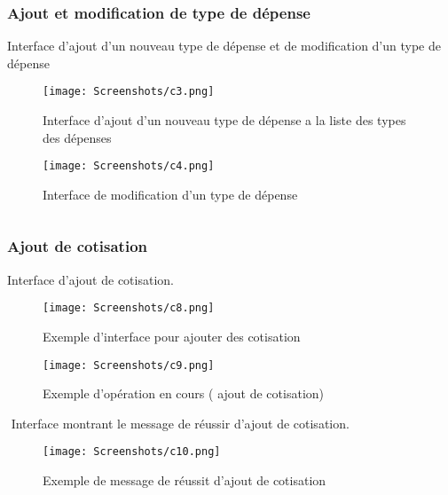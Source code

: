       \subsubsection{Ajout et modification de type de dépense}
      Interface d'ajout d'un nouveau type de dépense et de modification d'un type de dépense
      \begin{figure}[!htbp]
        \begin{minipage}[t]{0.4\textwidth}    %
                \texttt{[image: Screenshots/c3.png]}
                \caption{ Interface d'ajout d'un nouveau type de dépense a la liste des types des dépenses}
        \end{minipage}%
        \begin{minipage}{0.20\textwidth}
          \hfill
        \end{minipage}
      \begin{minipage}[t]{0.4\textwidth}
              \texttt{[image: Screenshots/c4.png]}
              \caption{ Interface de modification d'un  type de dépense}
      \end{minipage}%
        \end{figure}
        $ $
        \newpage
      \subsubsection{ Ajout de cotisation}
      Interface d'ajout de cotisation.
      \begin{figure}[!htbp]
        \begin{minipage}[t]{0.4\textwidth}    %
                \texttt{[image: Screenshots/c8.png]}
                \caption{ Exemple d'interface pour ajouter des cotisation}
        \end{minipage}%
        \begin{minipage}{0.20\textwidth}
          \hfill
        \end{minipage}
      \begin{minipage}[t]{0.4\textwidth}
              \texttt{[image: Screenshots/c9.png]}
              \caption{ Exemple d'opération en cours ( ajout de cotisation)}
      \end{minipage}%
        \end{figure}
        $ $
\newpage
Interface montrant le message de réussir d'ajout de cotisation.
        \begin{figure}[!htbp]
          \begin{minipage}[t]{0.4\textwidth}    %
                  \texttt{[image: Screenshots/c10.png]}
                  \caption{ Exemple de message de réussit d'ajout de cotisation}
          \end{minipage}%
        \end{figure}
      \newpage
